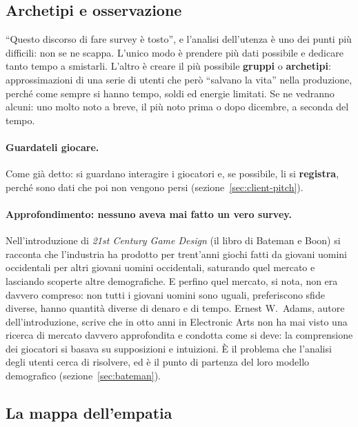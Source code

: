 \subsection{Archetipi e osservazione}

``Questo discorso di fare survey è tosto'', e l'analisi dell'utenza è uno dei
punti più difficili: non se ne scappa. L'unico modo è prendere più dati
possibile e dedicare tanto tempo a smistarli. L'altro è creare il più
possibile \textbf{gruppi} o \textbf{archetipi}: approssimazioni di una serie
di utenti che però ``salvano la vita'' nella produzione, perché come sempre si
hanno tempo, soldi ed energie limitati. Se ne vedranno alcuni: uno molto noto
a breve, il più noto prima o dopo dicembre, a seconda del tempo.

\paragraph{Guardateli giocare.} Come già detto: si guardano interagire i
giocatori e, se possibile, li si \textbf{registra}, perché sono dati che poi
non vengono persi (sezione~\ref{sec:client-pitch}).

\paragraph{Approfondimento: nessuno aveva mai fatto un vero survey.}
Nell'introduzione di \emph{21st Century Game Design} (il libro di Bateman e
Boon) si racconta che l'industria ha prodotto per trent'anni giochi fatti da giovani
uomini occidentali per altri giovani uomini occidentali, saturando quel
mercato e lasciando scoperte altre demografiche. E perfino quel mercato, si nota,
non era davvero compreso: non tutti i giovani uomini sono uguali, preferiscono
sfide diverse, hanno quantità diverse di denaro e di tempo. Ernest W.~Adams,
autore dell'introduzione, scrive che in otto anni in Electronic Arts non ha
mai visto una ricerca di mercato davvero approfondita e condotta come si
deve: la comprensione dei giocatori si basava su supposizioni e
intuizioni. È il
problema che l'analisi degli utenti cerca di risolvere, ed è il punto di
partenza del loro modello demografico (sezione~\ref{sec:bateman}).

\subsection{La mappa dell'empatia}

